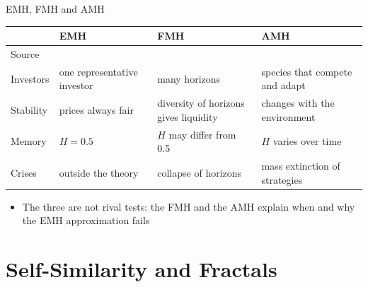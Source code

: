 \begin{frame}{EMH, FMH and AMH}
\itemsize{\small}
\begin{center}
\footnotesize
\begin{tabular}{>{\raggedright\arraybackslash}p{2.2cm}>{\raggedright\arraybackslash}p{2.9cm}>{\raggedright\arraybackslash}p{2.9cm}>{\raggedright\arraybackslash}p{2.9cm}}
\toprule
 & \textbf{EMH} & \textbf{FMH} & \textbf{AMH} \\
\midrule
Source & {} & {} & {} \\
Investors & one representative investor & many horizons & species that compete and adapt \\
Stability & prices always fair & diversity of horizons gives liquidity & changes with the environment \\
Memory & $H = 0.5$ & $H$ may differ from 0.5 & $H$ varies over time \\
Crises & outside the theory & collapse of horizons & mass extinction of strategies \\
\bottomrule
\end{tabular}
\end{center}
\begin{itemize}
    \item The three are not rival tests: the FMH and the AMH explain when and why the EMH approximation fails
\end{itemize}
\end{frame}


\section{Self-Similarity and Fractals}


